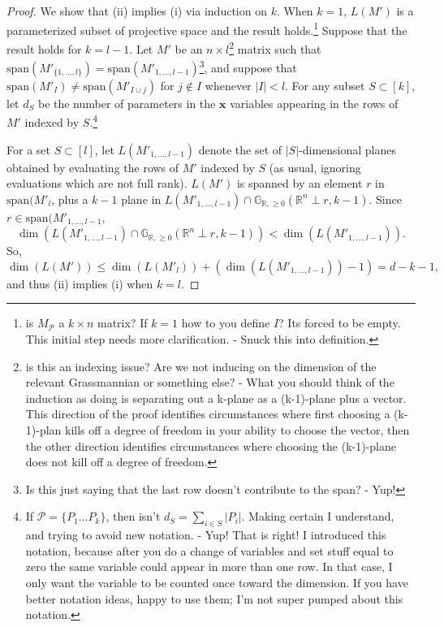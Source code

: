 \documentclass[11pt]{article}
\newcommand{\sanote}{\todo[color=violet!30]}
\newcommand{\R}{\mathbb{R}}
\newcommand{\Gr}{\mathbb{G}_{\R, \geq 0}}
\newcommand{\cP}{\mathcal{P}}
\theoremstyle{remark}
\theoremstyle{definition}
\begin{document}
\begin{appendices}
\begin{proof}
We show that (ii) implies (i) via induction on $k$. When $k = 1$, $L(M')$ is a parameterized subset of projective space and the result holds.\footnote{is $M_\cP$ a $k \times n$ matrix? If $k =1$ how to you define $I$? Its forced to be empty. This initial step needs more clarification. - Snuck this into definition.} Suppose that the result holds for $k = l-1$. Let $M'$ be an $n \times l$\footnote{is this an indexing issue? Are we not inducing on the dimension of the relevant Grassmannian or something else? - What you should think of the induction as doing is separating out a k-plane as a (k-1)-plane plus a vector. This direction of the proof identifies circumstances where first choosing a (k-1)-plan kills off a degree of freedom in your ability to choose the vector, then the other direction identifies circumstances where choosing the (k-1)-plane does not kill off a degree of freedom.} matrix such that $\mathrm{span}(M'_{\{1,\dots,l\}}) = \mathrm{span}(M'_{1,\dots,l-1})$\footnote{Is this just saying that the last row doesn't contribute to the span? - Yup!}, and suppose that $\mathrm{span}(M'_I) \neq \mathrm{span}(M'_{I \cup j})$ for $j \notin I$ whenever $|I| < l$. For any subset $S \subset [k]$, let $d_S$ be the number of parameters in the $\mathbf{x}$ variables appearing in the rows of $M'$ indexed by $S$.\footnote{If $\cP = \{ P_1 \ldots P_k\}$, then isn't $d_S = \sum_{i \in S}|P_i|$. Making certain I understand, and trying to avoid new notation. - Yup! That is right! I introduced this notation, because after you do a change of variables and set stuff equal to zero the same variable could appear in more than one row. In that case, I only want the variable to be counted once toward the dimension. If you have better notation ideas, happy to use them; I'm not super pumped about this notation.}

For a set $S \subset [l]$, let $L(M'_{1,\dots,l-1})$ denote the set of $|S|$-dimensional planes obtained by evaluating the rows of $M'$ indexed by $S$ (as usual, ignoring evaluations which are not full rank). $L(M')$ is spanned by an element $r$ in $\mathrm{span}(M'_{l}$, plus a $k-1$ plane in $L(M'_{1,\dots,l-1}) \cap \Gr(\mathbb{R}^n \perp r, k-1)$. Since $r \in \mathrm{span}(M'_{1, \dots, l-1}$,
% 
\sanote{stopped here}
\begin{displaymath}
\dim(L(M'_{1,\dots,l-1}) \cap \Gr(\mathbb{R}^n \perp r, k-1)) < \dim(L(M'_{1,\dots,l-1})).
\end{displaymath}
%
\noindent
So,
%
\begin{displaymath}
\dim(L(M')) \leq \dim(L(M'_{l})) + (\dim(L(M'_{1,\dots,l-1})) - 1) = d -k - 1,
\end{displaymath}
%
\noindent
and thus (ii) implies (i) when $k = l$.


\end{proof}
\end{appendices}
\end{document}
